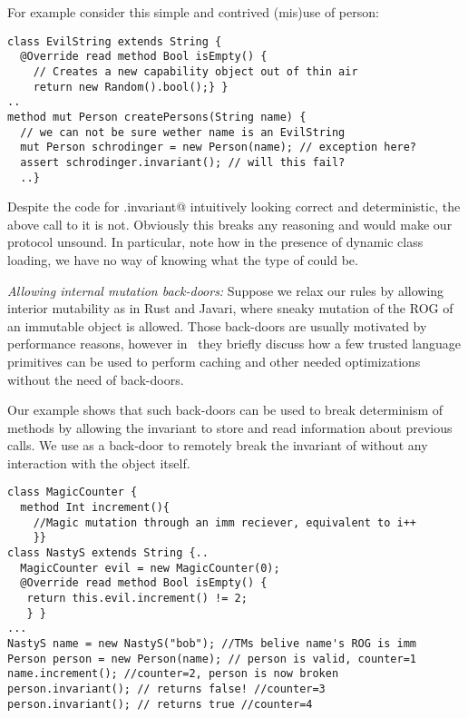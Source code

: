 \noindent For example consider this simple and contrived (mis)use of person:
\begin{lstlisting}[morekeywords={assert}]
class EvilString extends String {
  @Override read method Bool isEmpty() {
    // Creates a new capability object out of thin air
    return new Random().bool();} }
..
method mut Person createPersons(String name) {
  // we can not be sure wether name is an EvilString
  mut Person schrodinger = new Person(name); // exception here?
  assert schrodinger.invariant(); // will this fail?
  ..}
\end{lstlisting}
Despite the code for \Q@Person.invariant@ intuitively looking correct and deterministic, the above call to it is not. Obviously this breaks any reasoning and would make our protocol unsound. 
In particular, note how in the presence of dynamic class loading, we have no way of knowing what the type of \Q@name@ could be.

\loseSpace
\noindent\textit{Allowing internal mutation back-doors:}
Suppose we relax our rules by allowing interior mutability
as in Rust and Javari,  where sneaky mutation
of the ROG of an immutable object is allowed.
Those back-doors are usually motivated by performance reasons, however in~\cite{GordonEtAl12} they
briefly discuss how a few trusted language primitives can be used to perform caching and other needed optimizations
without the need of back-doors.

Our example shows that such back-doors can be used to break determinism of  \Q@invariant@ methods by allowing the invariant to store and read information about previous calls. We use \Q@MagicCounter@ as a back-door to remotely break the invariant of \Q@person@ without any interaction with the \Q@person@ object itself.

\begin{lstlisting}
class MagicCounter {
  method Int increment(){
    //Magic mutation through an imm reciever, equivalent to i++
    }}
class NastyS extends String {..
  MagicCounter evil = new MagicCounter(0);
  @Override read method Bool isEmpty() {
   return this.evil.increment() != 2; 
   } }
...
NastyS name = new NastyS("bob"); //TMs belive name's ROG is imm
Person person = new Person(name); // person is valid, counter=1
name.increment(); //counter=2, person is now broken
person.invariant(); // returns false! //counter=3
person.invariant(); // returns true //counter=4
\end{lstlisting}

